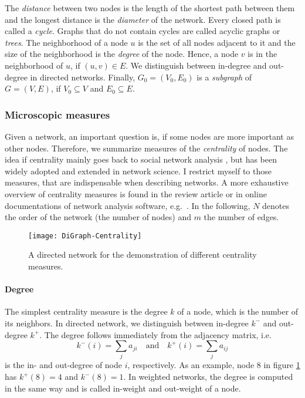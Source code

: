 The \emph{distance} between two nodes is the length of the shortest path between them and the longest distance is the \emph{diameter} of the network.
Every closed path is called a \emph{cycle}.
Graphs that do not contain cycles are called acyclic graphs or \emph{trees}.
The neighborhood of a node $u$ is the set of all nodes adjacent to it and the size of the neighborhood is the \emph{degree} of the node.
Hence, a node $v$ is in the neighborhood of $u$, if $(u,v) \in E$.
We distinguish between in-degree and out-degree in directed networks.
Finally, $G_0=(V_0,E_0)$ is a \emph{subgraph} of $G=(V,E)$, if $V_0 \subseteq V$ and $E_0 \subseteq E$.


\subsubsection{Microscopic measures}\label{sec:micro_measures}
Given a network, an important question is, if some nodes are more important as other nodes.
Therefore, we summarize measures of the \emph{centrality} of nodes.
The idea if centrality mainly goes back to social network analysis \citep{WassermanFaust,Freeman}, but has been widely adopted and extended in network science.
I restrict myself to those measures, that are indispensable when describing networks.
A more exhaustive overview of centrality measures is found in the review article \citep{MartinezLopez2009} or in online documentations of network analysis software, e.g.~\citep{hagberg2008,networkx:}.
In the following, $N$ denotes the order of the network (the number of nodes) and $m$ the number of edges.
%
\begin{figure}[htb]
\begin{center}
\texttt{[image: DiGraph-Centrality]}
\caption{A directed network for the demonstration of different centrality measures.}
\label{fig:example_net}
\end{center}
\end{figure}
%

\paragraph{Degree\color{Cayenne}{.}}
The simplest centrality measure is the degree $k$ of a node, which is the number of its neighbors.
In directed network, we distinguish between in-degree $k^-$ and out-degree $k^+$.
The degree follows immediately from the adjacency matrix, i.e.
\[
k ^-(i) = \sum _j a_{ji} \quad \text{and} \quad k ^+ (i)= \sum _j a_{ij}
\]
is the in- and out-degree of node $i$, respectively.
As an example, node $8$ in figure \ref{fig:example_net} has $k ^+(8)=4$ and $k ^- (8)=1$.
In weighted networks, the degree is computed in the same way and is called in-weight and out-weight of a node.

